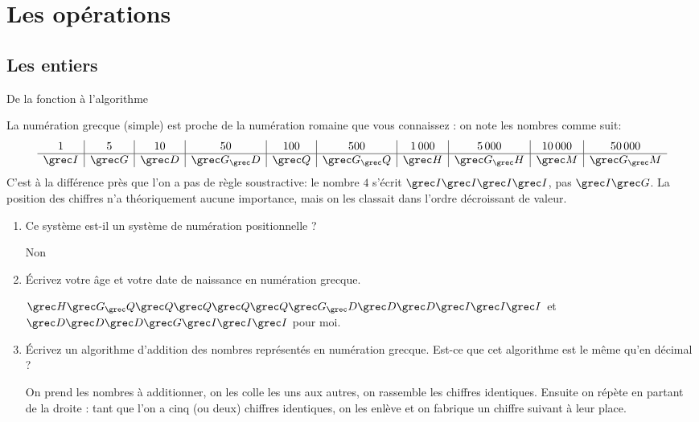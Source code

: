 \section{Les opérations}
\subsection{Les entiers}
\begin{exercice}
  \begin{exercicelet}{De la fonction à l'algorithme}

    La numération grecque (simple) est proche de la numération romaine que
    vous connaissez : on note les nombres comme suit:
    \[\begin{array}{c|c|c|c|c|c|c|c|c|c}
      1&5&10&50&100&500&1\,000&5\,000&10\,000&50\,000\\\hline
      \Iota&\Gamma&\Delta&\Gamma_\Delta&\Chi&\Gamma_\Chi&\Eta&\Gamma_\Eta&\Mu&\Gamma_\Mu
    \end{array}
    \] C'est à la différence près que l'on a pas de règle soustractive: le
    nombre $4$ s'écrit $\Iota\Iota\Iota\Iota$, pas $\Iota\Gamma$. La
    position des chiffres n'a théoriquement aucune importance, mais on les
    classait dans l'ordre décroissant de valeur.
    \begin{enumerate}
    \item Ce système est-il un système de numération positionnelle ?
      \begin{correction}Non\end{correction}
    \item Écrivez votre âge et votre date de naissance en numération
      grecque.
      \begin{xcorrection}$\Eta\Gamma_\Chi\Chi\Chi\Chi\Chi\Gamma_\Delta\Delta\Delta\Iota\Iota\Iota$
        et $\Delta\Delta\Delta\Gamma\Iota\Iota\Iota$ pour moi.\end{xcorrection}
    \item Écrivez un algorithme d'addition des nombres représentés en
      numération grecque. Est-ce que cet algorithme est le même qu'en décimal
      ?
      \begin{xcorrection}On prend les nombres à additionner, on les colle
        les uns aux autres, on rassemble les chiffres identiques. Ensuite on
        répète en partant de la droite : tant que l'on a cinq (ou deux) chiffres
        identiques, on les enlève et on fabrique un chiffre suivant à leur
        place.


\end{xcorrection}
\end{enumerate}
\end{exercicelet}
\end{exercice}
